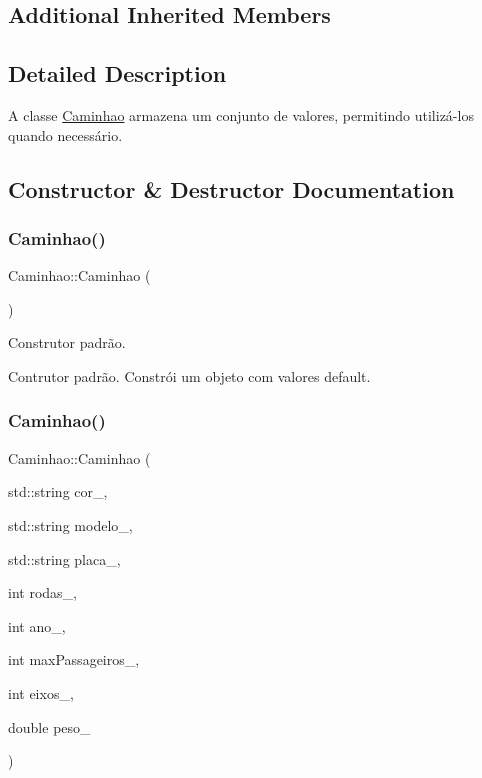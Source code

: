 \subsection*{Additional Inherited Members}


\subsection{Detailed Description}
A classe \hyperlink{classCaminhao}{Caminhao} armazena um conjunto de valores, permitindo utilizá-\/los quando necessário. 

\subsection{Constructor \& Destructor Documentation}
\mbox{\label{classCaminhao_ae2621d6abfa0d9be4c3e3d6ae44a8b88}} 
\subsubsection{\texorpdfstring{Caminhao()}{Caminhao()}\hspace{0.1cm}{\footnotesize\ttfamily [1/2]}}
{\footnotesize\ttfamily Caminhao\+::\+Caminhao (\begin{DoxyParamCaption}{ }\end{DoxyParamCaption})}



Construtor padrão. 

Contrutor padrão. Constrói um objeto com valores default. \mbox{\label{classCaminhao_af3cdf63c2b7ff42d61649b1fdb4b540b}} 
\subsubsection{\texorpdfstring{Caminhao()}{Caminhao()}\hspace{0.1cm}{\footnotesize\ttfamily [2/2]}}
{\footnotesize\ttfamily Caminhao\+::\+Caminhao (\begin{DoxyParamCaption}\item[{std\+::string}]{cor\+\_\+,  }\item[{std\+::string}]{modelo\+\_\+,  }\item[{std\+::string}]{placa\+\_\+,  }\item[{int}]{rodas\+\_\+,  }\item[{int}]{ano\+\_\+,  }\item[{int}]{max\+Passageiros\+\_\+,  }\item[{int}]{eixos\+\_\+,  }\item[{double}]{peso\+\_\+ }\end{DoxyParamCaption})}


